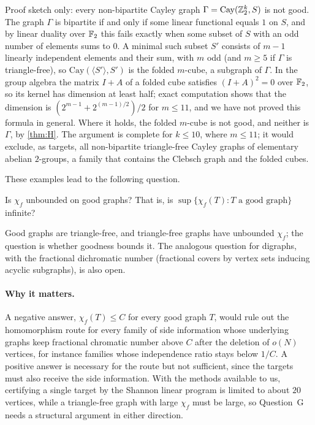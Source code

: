 \begin{remark}\label{rem:ana-z2}
Proof sketch only: every non-bipartite Cayley graph $\Gamma=\mathrm{Cay}(\mathbb{Z}_2^k,S)$ is not good. The graph $\Gamma$ is
bipartite if and only if some linear functional equals $1$ on $S$, and by linear duality over $\mathbb{F}_2$ this fails exactly
when some subset of $S$ with an odd number of elements sums to $0$. A minimal such subset $S'$ consists of $m-1$ linearly independent
elements and their sum, with $m$ odd (and $m\ge5$ if $\Gamma$ is triangle-free), so $\mathrm{Cay}(\langle
S'\rangle,S')$ is the folded $m$-cube, a subgraph of $\Gamma$. In the group algebra the matrix $I+A$ of a folded cube
satisfies $(I+A)^2=0$ over $\mathbb{F}_2$, so its kernel has dimension at least half; exact computation shows that the dimension
is $(2^{m-1}+2^{(m-1)/2})/2$ for $m\le11$, and we have not proved this formula in general. Where it holds, the folded
$m$-cube is not good, and neither is $\Gamma$, by \cref{thm:H}. The argument is complete for $k\le10$, where $m\le11$;
it would exclude, as targets, all non-bipartite triangle-free Cayley graphs of elementary abelian $2$-groups, a family that contains
the Clebsch graph and the folded cubes.
\end{remark}

These examples lead to the following question.

\begin{question}\label{prob:G}
Is $\chi_f$ unbounded on good graphs? That is, is $\sup\{\chi_f(T):T\text{ a good graph}\}$ infinite?
\end{question}

Good graphs are triangle-free, and triangle-free graphs have unbounded $\chi_f$; the question is whether goodness bounds
it. The analogous question for digraphs, with the fractional dichromatic number (fractional covers by vertex sets
inducing acyclic subgraphs), is also open.

\paragraph{Why it matters.} A negative answer, $\chi_f(T)\le C$ for every good graph $T$, would rule out the homomorphism
route for every family of side information whose underlying graphs keep fractional chromatic number above $C$ after the
deletion of $o(N)$ vertices, for instance families whose independence ratio stays below $1/C$. A positive answer is
necessary for the route but not sufficient, since the targets must also receive the side information. With the methods
available to us, certifying a single target by the Shannon linear program is limited to about $20$ vertices, while a
triangle-free graph with large $\chi_f$ must be large, so Question~G needs a structural argument in either direction.
